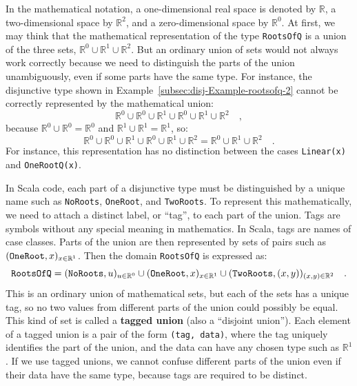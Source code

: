 In the mathematical notation, a one-dimensional real space is denoted
by $\mathbb{R}$, a two-dimensional space by $\mathbb{R}^{2}$, and
a zero-dimensional space by $\mathbb{R}^{0}$. At first, we may think
that the mathematical representation of the type \lstinline!RootsOfQ!
is a union of the three sets, $\mathbb{R}^{0}\cup\mathbb{R}^{1}\cup\mathbb{R}^{2}$.
But an ordinary union of sets would not always work correctly because
we need to distinguish the parts of the union unambiguously, even
if some parts have the same type. For instance, the disjunctive type
shown in Example~\ref{subsec:disj-Example-rootsofq-2} cannot be
correctly represented by the mathematical union:
\[
\mathbb{R}^{0}\cup\mathbb{R}^{0}\cup\mathbb{R}^{1}\cup\mathbb{R}^{0}\cup\mathbb{R}^{1}\cup\mathbb{R}^{2}\quad,
\]
because $\mathbb{R}^{0}\cup\mathbb{R}^{0}=\mathbb{R}^{0}$ and $\mathbb{R}^{1}\cup\mathbb{R}^{1}=\mathbb{R}^{1}$,
so:
\[
\mathbb{R}^{0}\cup\mathbb{R}^{0}\cup\mathbb{R}^{1}\cup\mathbb{R}^{0}\cup\mathbb{R}^{1}\cup\mathbb{R}^{2}=\mathbb{R}^{0}\cup\mathbb{R}^{1}\cup\mathbb{R}^{2}\quad.
\]
For instance, this representation has no distinction between the cases
\lstinline!Linear(x)! and \lstinline!OneRootQ(x)!.

In Scala code, each part of a disjunctive type must be distinguished
by a unique name such as \lstinline!NoRoots!, \lstinline!OneRoot!,
and \lstinline!TwoRoots!. To represent this mathematically, we need
to attach a distinct label, or \textsf{``}tag\textsf{''}, to each part of the union.
Tags are symbols without any special meaning in mathematics. In Scala,
tags are names of case classes. Parts of the union are then represented
by sets of pairs such as $(\text{\texttt{OneRoot}},x)_{x\in\mathbb{R}^{1}}$.
Then the domain \lstinline!RootsOfQ! is expressed as:
\[
\text{\texttt{RootsOfQ}}=(\text{\texttt{NoRoots}},u)_{u\in\mathbb{R}^{0}}\cup(\text{\texttt{OneRoot}},x)_{x\in\mathbb{R}^{1}}\cup(\text{\texttt{TwoRoots}},\left(x,y\right))_{\left(x,y\right)\in\mathbb{R}^{2}}\quad.
\]
This is an ordinary union of mathematical sets, but each of the sets
has a unique tag, so no two values from different parts of the union
could possibly be equal. This kind of set is called a \textbf{tagged
union} (also a \textsf{``}disjoint union\textsf{''}).
Each element of a tagged union is a pair of the form \lstinline!(tag, data)!,
where the tag uniquely identifies the part of the union, and the data
can have any chosen type such as $\mathbb{R}^{1}$. If we use tagged
unions, we cannot confuse different parts of the union even if their
data have the same type, because tags are required to be distinct.

